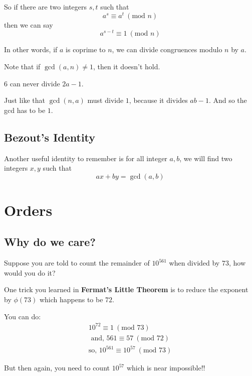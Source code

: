 \documentclass[compress]{beamer}
\newcommand{\gap}{\pause\vspace{1em}}
\begin{document}
\begin{frame}
    So if there are two integers $s, t$ such that 
    \[a^s \equiv a^t \ (\text{mod } n)\]
    then we can say
    \[a^{s-t} \equiv 1 \ (\text{mod } n)\]

    \gap

    \textcolor{NordRed}{In other words, if $a$ is coprime to $n$, we can
    divide congruences modulo $n$ by $a$.}
\end{frame}

\begin{frame}
    Note that if $\gcd\left(a, n\right)\neq 1$, then it doesn't hold. 

    \gap

    $6$ can never divide $2a - 1$. 

    \gap
    Just like that $\gcd(n, a)$ must divide $1$, because it divides $ab-1$.
    And so the gcd has to be $1$.
\end{frame}

\subsection{Bezout's Identity}

\begin{frame}
    Another useful identity to remember is \textcolor{NordOrange}{for all
        integer $a, b$, we will
        find two integers $x, y$ such that 
        \[ax + by = \gcd\left(a, b\right) \]
    } 
\end{frame}


\section{Orders}
\subsection{Why do we care?}

\begin{frame}
    \textcolor{NordOrange}{
        Suppose you are told to count the remainder of $10^{561}$ when divided by
        $73$, how would you do it?
    }

    \gap

    One trick you learned in \textbf{Fermat's Little Theorem} is to reduce the
    exponent by $\phi(73)$ which happens to be $72$.

    \gap

    You can do:
    \begin{align*}
        10^{72} \equiv 1\ (\text{mod } 73)\\
        \text{ and, } 561 \equiv 57\ (\text{mod } 72)\\
        \text{so, } 10^{561} \equiv 10^{57} \ (\text{mod } 73) 
    \end{align*}

    \gap
    But then again, you need to count \textcolor{NordRed}{$10^{57}$} which is
    near impossible!!
\end{frame}
\end{document}
